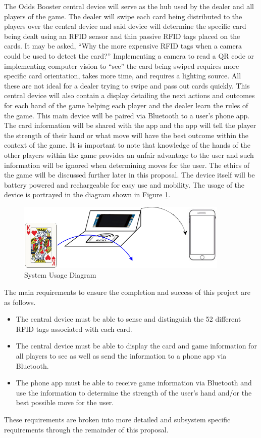 \documentclass[12pt]{article}
\begin{document}
The Odds Booster central device will serve as the hub used by the dealer and all players of the game. The dealer will swipe each card being distributed to the players over the central device and said device will determine the specific card being dealt using an RFID sensor and thin passive RFID tags placed on the cards. It may be asked, ``Why the more expensive RFID tags when a camera could be used to detect the card?'' Implementing a camera to read a QR code or implementing computer vision to ``see'' the card being swiped requires more specific card orientation, takes more time, and requires a lighting source. All these are not ideal for a dealer trying to swipe and pass out cards quickly. This central device will also contain a display detailing the next actions and outcomes for each hand of the game helping each player and the dealer learn the rules of the game. This main device will be paired via Bluetooth to a user's phone app. The card information will be shared with the app and the app will tell the player the strength of their hand or what move will have the best outcome within the context of the game. It is important to note that knowledge of the hands of the other players within the game provides an unfair advantage to the user and such information will be ignored when determining moves for the user. The ethics of the game will be discussed further later in this proposal. The device itself will be battery powered and rechargeable for easy use and mobility. The usage of the device is portrayed in the diagram shown in Figure \ref{fig:use_dia}.

\begin{figure}[!h]
	\centering
	\includegraphics[width=0.9\textwidth]{ProposalUsageDiagram.png}
	\caption{System Usage Diagram}
	\label{fig:use_dia}
\end{figure}

\noindent
The main requirements to ensure the completion and success of this project are as follows.
\begin{itemize}
\item The central device must be able to sense and distinguish the 52 different RFID tags associated with each card.
\item The central device must be able to display the card and game information for all players to see as well as send the information to a phone app via Bluetooth.
\item The phone app must be able to receive game information via Bluetooth and use the information to determine the strength of the user's hand and/or the best possible move for the user.
\end{itemize}
These requirements are broken into more detailed and subsystem specific requirements through the remainder of this proposal.
\end{document}
